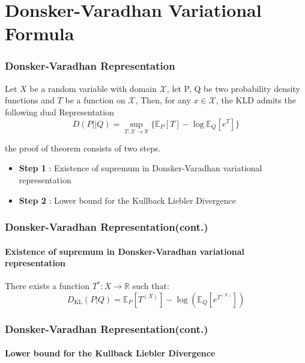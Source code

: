 \documentclass{beamer}
\begin{document}
\section{Donsker-Varadhan Variational Formula}
	\begin{frame}
		\frametitle{Donsker-Varadhan Representation}
		\begin{theorem}
			Let $X$ be a random variable with domain $\mathcal{X}$, let P, Q be two probability density functions
			and $T$ be a function on $\mathcal{X}$, 
			Then, for any $x \in \mathcal{X}$, the KLD admits the following dual Representation
			\begin{equation*}
				D(P || Q) = \sup_{T:\mathcal{X} \rightarrow \mathbb{R}} \{ \mathbb{E}_P[T] - \log \mathbb{E}_Q[e^{T}]\}
			\end{equation*}
		\end{theorem}
		the proof of theorem consists of two steps.
		\begin{itemize}
			\item \textbf{Step 1} : Existence of supremum in Donsker-Varadhan variational representation
			\item \textbf{Step 2} : Lower bound for the Kullback Liebler Divergence
		\end{itemize}	
	\end{frame}

	\begin{frame}
		\frametitle{Donsker-Varadhan Representation(cont.)}
		\framesubtitle{Existence of supremum in Donsker-Varadhan variational representation}
		There exists a function $T^*: X \rightarrow \mathbb{R}$ such that:
		\begin{equation*}
			D_{\text{KL}}(P|Q) = \mathbb{E}_P[T^(X)] - \log\left(\mathbb{E}_Q[e^{T^(X)}]\right)			
		\end{equation*}

	\end{frame}

	\begin{frame}
		\frametitle{Donsker-Varadhan Representation(cont.)}
		\framesubtitle{Lower bound for the Kullback Liebler Divergence}
		
	\end{frame}

	

\end{document}

